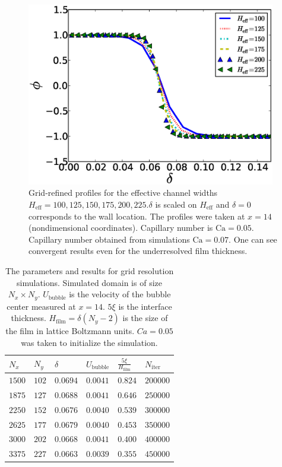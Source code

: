 \documentclass[preprint,12pt]{elsarticle}
\newcommand{\Ca}{\mathrm{Ca}}
\begin{document}
\begin{figure}
\includegraphics[width=0.97\textwidth]{Figures/Grid/norm_grid_profs.eps}
\caption{Grid-refined profiles for the effective
channel widths
$H_{\mathrm{eff}}=100,125,150,175,200,225$.$\delta$ is scaled on $H_\mathrm{eff}$ and $\delta=0$
corresponds to the wall location. The profiles were taken at $x=14$ (nondimensional coordinates).
Capillary number is $\Ca=0.05$. Capillary number obtained from simulations $\Ca=0.07$. One can
see
convergent results even for the underresolved film
thickness.\label{fig:grid:profiles}}
\end{figure}
\begin{table}
\begin{tabularx}{0.97\textwidth}{|X|X|X|X|X|X|}
\hline
$N_x$&$N_y$&$\delta$&$U_\mathrm{bubble}$&$\frac{5\xi}{H_{\mathrm{film}}}$&$N_\mathrm{iter}$\\
\hline
$1500$&$102$&$0.0694$&$0.0041$&$0.824$&$200000$\\
\hline
$1875$&$127$&$0.0688$&$0.0041$&$0.646$&$250000$\\
\hline
$2250$&$152$&$0.0676$&$0.0040$&$0.539$&$300000$\\
\hline
$2625$&$177$&$0.0679$&$0.0040$&$0.453$&$350000$\\
\hline
$3000$&$202$&$0.0668$&$0.0041$&$0.400$&$400000$\\
\hline
$3375$&$227$&$0.0663$&$0.0039$&$0.355$&$450000$\\
\hline
\end{tabularx}
\caption{The parameters and results for grid resolution simulations. Simulated domain is
of size $N_x \times N_y$. $U_\mathrm{bubble}$ is the velocity of the bubble center measured at
$x=14$.  $5\xi$ is the interface thickness. $H_{\mathrm{film}}=\delta (N_y-2)$ is the size of the film in
lattice Boltzmann units. $Ca=0.05$ was taken to initialize the simulation.
\label{table:parameters:grid:refinement}}
\end{table}
\end{document}
